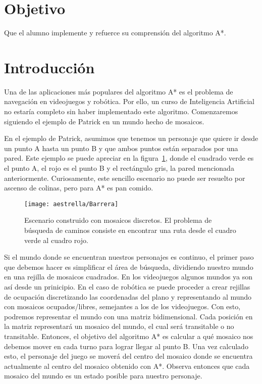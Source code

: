 
\section{Objetivo}

Que el alumno implemente y refuerce su comprensión del algoritmo A*.

\section{Introducci\'on}

Una de las aplicaciones más populares del algoritmo A* es el problema de navegación en videojuegos y robótica.  Por ello, un curso de Inteligencia Artificial no estaría completo sin haber implementado este algoritmo.  Comenzaremos siguiendo el ejemplo de Patrick \cite{Lester2003} en un mundo hecho de mosaicos.

En el ejemplo de Patrick, asumimos que tenemos un personaje que quiere ir desde un punto A hasta un punto B y que ambos puntos están separados por una pared. Este ejemplo se puede apreciar en la figura~\ref{fig:AEstrellaIni}, donde el cuadrado verde es el punto A, el rojo es el punto B y el rectángulo gris, la pared mencionada anteriormente.  Curiosamente, este sencillo escenario no puede ser resuelto por ascenso de colinas, pero para A* es pan comido.

\begin{figure}
  \centering
  \texttt{[image: aestrella/Barrera]}
  \caption{Escenario construido con mosaicos discretos. El problema de búsqueda de caminos consiste en encontrar una ruta desde el cuadro verde al cuadro rojo.}
  \label{fig:AEstrellaIni}
\end{figure}

Si el mundo donde se encuentran nuestros personajes es continuo, el primer paso que debemos hacer es simplificar el área de búsqueda, dividiendo nuestro mundo en una rejilla de mosaicos cuadrados.  En los videojuegos algunos mundos ya son así desde un prinicipio.  En el caso de robótica se puede proceder a crear rejillas de ocupación discretizando las coordenadas del plano y representando al mundo con mosaicos ocupados/libres, semejantes a los de los videojuegos.  Con esto, podremos representar el mundo con una matriz bidimensional. Cada posición en la matriz representará un mosaico del mundo, el cual será transitable o no transitable. Entonces, el objetivo del algoritmo A* es calcular a qué mosaico nos debemos mover en cada turno para lograr llegar al punto B. Una vez calculado esto, el personaje del juego se moverá del centro del mosaico donde se encuentra actualmente al centro del mosaico obtenido con A*.  Observa entonces que cada mosaico del mundo es un estado posible para nuestro personaje.

